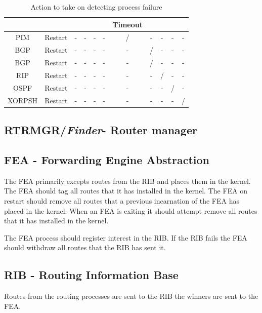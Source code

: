 \documentclass[11pt]{article}
\makeatletter
\newcommand{\finder} {{\em Finder}\@\xspace}
\makeatother
\begin{document}
\begin{table}[ht]
\begin{center}
\begin{tabular}{|c|c|c|c|c|c|c|c|c|c|c|}
              &                &          &      &      &      & Timeout &      &      &      &        \\\hline
PIM           &  Restart       & -        & -    & -    & -    & /       & -    & -    & -    & -      \\\hline
BGP           &  Restart       & -        & -    & -    & -    & -       & /    & -    & -    & -      \\\hline
BGP           &  Restart       & -        & -    & -    & -    & -       & /    & -    & -    & -      \\\hline
RIP           &  Restart       & -        & -    & -    & -    & -       & -    & /    & -    & -      \\\hline
OSPF          &  Restart       & -        & -    & -    & -    & -       & -    & -    & /    & -      \\\hline
XORPSH        &  Restart       & -        & -    & -    & -    & -       & -    & -    & -    & /      \\\hline
\end{tabular}
\end{center}
\caption{\label{failure_table}Action to take on detecting process failure}
\end{table}


\subsection{RTRMGR/\finder - Router manager}


\subsection{FEA - Forwarding Engine Abstraction}
The FEA primarily excepts routes from the RIB and places them in the
kernel. The FEA should tag all routes that it has installed in the
kernel. The FEA on restart should remove all routes that a previous
incarnation of the FEA has placed in the kernel. When an FEA is
exiting it should attempt remove all routes that it has installed in
the kernel.

The FEA process should register interest in the RIB. If the RIB fails
the FEA should withdraw all routes that the RIB has sent it.

\subsection{RIB - Routing Information Base}
Routes from the routing processes are sent to the RIB the winners are
sent to the FEA.
\end{document}
